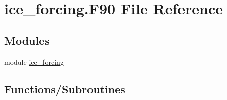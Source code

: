 \hypertarget{ice__forcing_8F90}{
\section{ice\_\-forcing.F90 File Reference}
\label{ice__forcing_8F90}
}
\subsection*{Modules}
\begin{DoxyCompactItemize}
\item 
module \hyperlink{namespaceice__forcing}{ice\_\-forcing}
\end{DoxyCompactItemize}
\subsection*{Functions/Subroutines}
